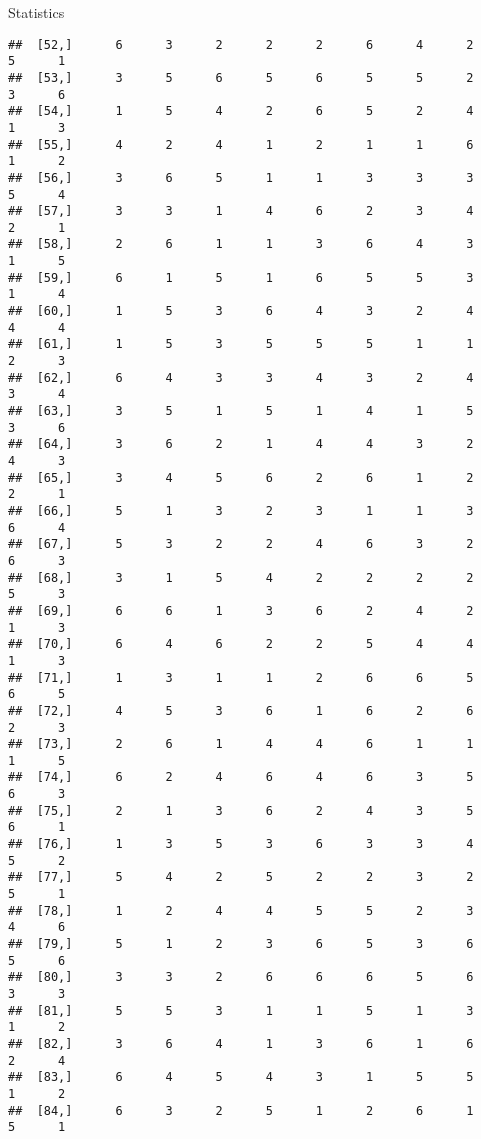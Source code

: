 \documentclass[
  ignorenonframetext,
]{beamer}
\begin{document}
\begin{frame}[fragile]{Statistics}
\begin{verbatim}
##  [52,]      6      3      2      2      2      6      4      2      5      1
##  [53,]      3      5      6      5      6      5      5      2      3      6
##  [54,]      1      5      4      2      6      5      2      4      1      3
##  [55,]      4      2      4      1      2      1      1      6      1      2
##  [56,]      3      6      5      1      1      3      3      3      5      4
##  [57,]      3      3      1      4      6      2      3      4      2      1
##  [58,]      2      6      1      1      3      6      4      3      1      5
##  [59,]      6      1      5      1      6      5      5      3      1      4
##  [60,]      1      5      3      6      4      3      2      4      4      4
##  [61,]      1      5      3      5      5      5      1      1      2      3
##  [62,]      6      4      3      3      4      3      2      4      3      4
##  [63,]      3      5      1      5      1      4      1      5      3      6
##  [64,]      3      6      2      1      4      4      3      2      4      3
##  [65,]      3      4      5      6      2      6      1      2      2      1
##  [66,]      5      1      3      2      3      1      1      3      6      4
##  [67,]      5      3      2      2      4      6      3      2      6      3
##  [68,]      3      1      5      4      2      2      2      2      5      3
##  [69,]      6      6      1      3      6      2      4      2      1      3
##  [70,]      6      4      6      2      2      5      4      4      1      3
##  [71,]      1      3      1      1      2      6      6      5      6      5
##  [72,]      4      5      3      6      1      6      2      6      2      3
##  [73,]      2      6      1      4      4      6      1      1      1      5
##  [74,]      6      2      4      6      4      6      3      5      6      3
##  [75,]      2      1      3      6      2      4      3      5      6      1
##  [76,]      1      3      5      3      6      3      3      4      5      2
##  [77,]      5      4      2      5      2      2      3      2      5      1
##  [78,]      1      2      4      4      5      5      2      3      4      6
##  [79,]      5      1      2      3      6      5      3      6      5      6
##  [80,]      3      3      2      6      6      6      5      6      3      3
##  [81,]      5      5      3      1      1      5      1      3      1      2
##  [82,]      3      6      4      1      3      6      1      6      2      4
##  [83,]      6      4      5      4      3      1      5      5      1      2
##  [84,]      6      3      2      5      1      2      6      1      5      1

\end{verbatim}
\end{frame}
\end{document}
